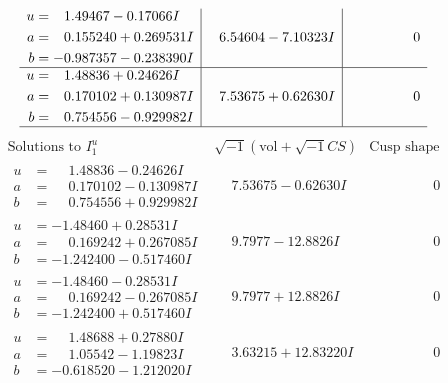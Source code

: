 \documentclass[1p]{elsarticle_modified}
\theoremstyle{definition}
\newcommand{\I}{\sqrt{-1}}
\begin{document}
$$\begin{array}{c|c|c}
\begin{aligned}
u &= \phantom{-}1.49467 - 0.17066 I \\
a &= \phantom{-}0.155240 + 0.269531 I \\
b &= -0.987357 - 0.238390 I\end{aligned}
 & \phantom{-}6.54604 - 7.10323 I & \phantom{-0.000000 } 0 \\ \hline\begin{aligned}
u &= \phantom{-}1.48836 + 0.24626 I \\
a &= \phantom{-}0.170102 + 0.130987 I \\
b &= \phantom{-}0.754556 - 0.929982 I\end{aligned}
 & \phantom{-}7.53675 + 0.62630 I & \phantom{-0.000000 } 0\\
 \hline 
 \end{array}$$\newpage$$\begin{array}{c|c|c}  
\text{Solutions to }I^u_{1}& \I (\text{vol} + \sqrt{-1}CS) & \text{Cusp shape}\\
 \hline 
\begin{aligned}
u &= \phantom{-}1.48836 - 0.24626 I \\
a &= \phantom{-}0.170102 - 0.130987 I \\
b &= \phantom{-}0.754556 + 0.929982 I\end{aligned}
 & \phantom{-}7.53675 - 0.62630 I & \phantom{-0.000000 } 0 \\ \hline\begin{aligned}
u &= -1.48460 + 0.28531 I \\
a &= \phantom{-}0.169242 + 0.267085 I \\
b &= -1.242400 - 0.517460 I\end{aligned}
 & \phantom{-}9.7977 - 12.8826 I & \phantom{-0.000000 } 0 \\ \hline\begin{aligned}
u &= -1.48460 - 0.28531 I \\
a &= \phantom{-}0.169242 - 0.267085 I \\
b &= -1.242400 + 0.517460 I\end{aligned}
 & \phantom{-}9.7977 + 12.8826 I & \phantom{-0.000000 } 0 \\ \hline\begin{aligned}
u &= \phantom{-}1.48688 + 0.27880 I \\
a &= \phantom{-}1.05542 - 1.19823 I \\
b &= -0.618520 - 1.212020 I\end{aligned}
 & \phantom{-}3.63215 + 12.83220 I & \phantom{-0.000000 } 0 \\ \hline\begin{aligned}

\end{aligned}
\end{array}$$
\end{document}

